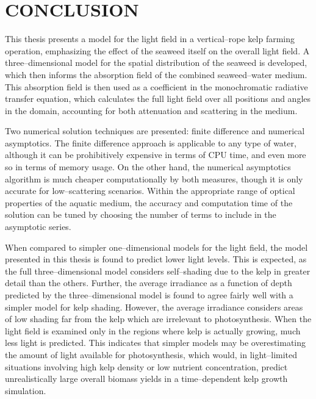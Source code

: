 \chapter{CONCLUSION}
\label{chap:conclusion}

This thesis presents a model for the light field in a vertical--rope kelp farming operation, emphasizing the effect of the seaweed itself on the overall light field.
A three--dimensional model for the spatial distribution of the seaweed is developed, which then informs the absorption field of the combined seaweed--water medium.
This absorption field is then used as a coefficient in the monochromatic radiative transfer equation, which calculates the full light field over all positions and angles in the domain, accounting for both attenuation and scattering in the medium.

Two numerical solution techniques are presented: finite difference and numerical asymptotics.
The finite difference approach is applicable to any type of water, although it can be prohibitively expensive in terms of CPU time, and even more so in terms of memory usage.
On the other hand, the numerical asymptotics algorithm is much cheaper computationally by both measures, though it is only accurate for low--scattering scenarios.
Within the appropriate range of optical properties of the aquatic medium, the accuracy and computation time of the solution can be tuned by choosing the number of terms to include in the asymptotic series.

When compared to simpler one--dimensional models for the light field, the model presented in this thesis is found to predict lower light levels.
This is expected, as the full three--dimensional model considers self--shading due to the kelp in greater detail than the others.
Further, the average irradiance as a function of depth predicted by the three--dimensional model is found to agree fairly well with a simpler model for kelp shading.
However, the average irradiance considers areas of low shading far from the kelp which are irrelevant to photosynthesis.
When the light field is examined only in the regions where kelp is actually growing, much less light is predicted.
This indicates that simpler models may be overestimating the amount of light available for photosynthesis, which would, in light--limited situations involving high kelp density or low nutrient concentration, predict unrealistically large overall biomass yields in a time--dependent kelp growth simulation.

